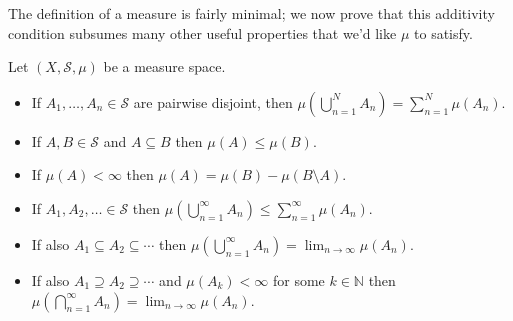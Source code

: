 \documentclass[11pt]{scrartcl}
\providecommand{\NN}{\mathbb N}
\providecommand{\ii}{\item}
\begin{document}
The definition of a measure is fairly minimal;
we now prove that this additivity condition subsumes
many other useful properties that we'd like $\mu$ to satisfy.

\pagebreak

\begin{prop}
    \label{prop:meas-space-props}
    Let $(X,\mathcal S, \mu)$ be a measure space.
    \begin{itemize}
	\ii[(0)] If $A_1,\dots,A_n\in\mathcal S$ are pairwise disjoint,
	then $\mu(\bigcup_{n=1}^N A_n) = \sum_{n=1}^N\mu(A_n)$.
	\ii[(1)] If $A,B\in\mathcal S$ and $A\subseteq B$ then $\mu(A)\le\mu(B)$.
	\ii[(1$'$)] If $\mu(A) < \infty$ then $\mu(A) = \mu(B) - \mu(B\setminus A)$.
	\ii[(2)] If $A_1,A_2,\ldots\in\mathcal S$ then
	$\mu(\bigcup_{n=1}^\infty A_n)\le \sum_{n=1}^\infty \mu(A_n)$.
	\ii[($2^\subset$)]If also $A_1\subseteq A_2\subseteq\cdots$
	then $\mu(\bigcup_{n=1}^\infty A_n) = \lim_{n\to\infty} \mu(A_n)$.
	\ii[($2^\supset$)]If also $A_1\supseteq A_2\supseteq\cdots$
	and $\mu(A_k) < \infty$ for some $k\in\NN$
	then $\mu(\bigcap_{n=1}^\infty A_n) = \lim_{n\to\infty} \mu(A_n)$.
    \end{itemize}
\end{prop}
\end{document}
